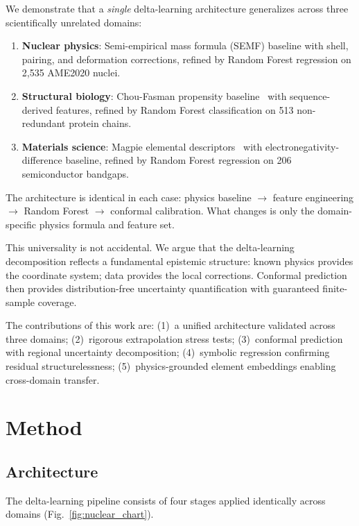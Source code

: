 \documentclass[twocolumn,letterpaper,10pt]{article}
\begin{document}
We demonstrate that a \emph{single} delta-learning architecture generalizes
across three scientifically unrelated domains:

\begin{enumerate}
  \item \textbf{Nuclear physics}: Semi-empirical mass formula (SEMF) baseline
    with shell, pairing, and deformation corrections, refined by Random Forest
    regression on 2,535 AME2020 nuclei.
  \item \textbf{Structural biology}: Chou-Fasman propensity
    baseline~\citep{chou1974} with sequence-derived features, refined by
    Random Forest classification on 513 non-redundant protein chains.
  \item \textbf{Materials science}: Magpie elemental
    descriptors~\citep{ward2016} with electronegativity-difference baseline,
    refined by Random Forest regression on 206 semiconductor bandgaps.
\end{enumerate}

The architecture is identical in each case: physics baseline $\to$ feature
engineering $\to$ Random Forest $\to$ conformal calibration. What changes
is only the domain-specific physics formula and feature set.

This universality is not accidental. We argue that the delta-learning
decomposition reflects a fundamental epistemic structure: known physics
provides the coordinate system; data provides the local corrections. Conformal
prediction~\citep{vovk2005} then provides distribution-free uncertainty
quantification with guaranteed finite-sample coverage.

The contributions of this work are: (1)~a unified architecture validated
across three domains; (2)~rigorous extrapolation stress tests; (3)~conformal
prediction with regional uncertainty decomposition; (4)~symbolic regression
confirming residual structurelessness; (5)~physics-grounded element embeddings
enabling cross-domain transfer.

\section{Method}
\label{sec:method}

\subsection{Architecture}

The delta-learning pipeline consists of four stages applied identically across
domains (Fig.~\ref{fig:nuclear_chart}).
\end{document}
